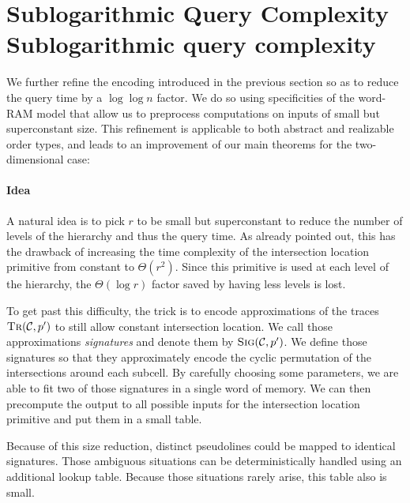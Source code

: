 \section{\iftitlecase%
Sublogarithmic Query Complexity\else%
Sublogarithmic query complexity\fi}\label{sec:query-time}

We further refine the encoding introduced in the previous section so as to
reduce the query time by a \( \log\log n \) factor. We do so using
specificities of the word-RAM model that allow us to preprocess computations
on inputs of small but superconstant size.
%
This refinement is applicable to both abstract and realizable order types,
and leads to an improvement of our main theorems for the two-dimensional case:
%
\TheoremGPTAbstractLogLog*
\TheoremGPTRealizableLogLog*
\TheoremGPTPreprocessingLogLog*

\paragraph{Idea}

A natural idea is to pick \(r\) to be small but superconstant to reduce the
number of levels of the hierarchy and thus the query time. As already pointed
out, this has the drawback of increasing the time complexity of the intersection
location primitive from constant to \(\Theta(r^2)\).
Since this primitive is used at each level of the hierarchy, the
\(\Theta(\log r)\) factor saved by having less levels is lost.

To get past this difficulty,
the trick is to encode approximations of the traces
\(\textsc{Tr}(\mathcal{C}, p')\) to still allow constant intersection location.
We call those approximations \emph{signatures} and denote them by
\(\textsc{Sig}(\mathcal{C}, p')\).
%
We define those signatures so that they approximately encode the cyclic
permutation of the intersections around each subcell. By carefully choosing some
parameters, we are able to fit two of those signatures in a single word of
memory. We can then precompute the output to all
possible inputs for the intersection location primitive and put them in a small
table.

Because of this size reduction, distinct pseudolines could
be mapped to identical signatures.
%
Those ambiguous situations can be deterministically handled using
an additional lookup table.
%
Because those situations rarely arise, this table also is small.

